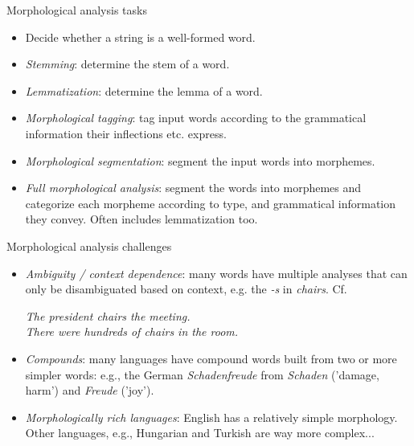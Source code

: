 \documentclass[style=upen, size=14pt]{powerdot}
\newcommand{\gold}{\color{arany}}
\begin{document}
\begin{slide}[toc=]{Morphological analysis tasks}
  \begin{itemize}
  \item Decide whether a string is a well-formed word.
  \item \emph{\gold Stemming}: determine the stem of a word.
  \item \emph{\gold Lemmatization}: determine the lemma of a word.
  \item \emph{\gold Morphological tagging}: tag input words according to the grammatical
    information their inflections etc. express.
  \item \emph{\gold Morphological segmentation}: segment the input words into morphemes.
  \item \emph{\gold Full morphological analysis}: segment the words into morphemes and
    categorize each morpheme according to type, and grammatical information they
    convey. Often includes lemmatization too.
  \end{itemize}
\end{slide}

\begin{slide}[toc=]{Morphological analysis challenges}
  \begin{itemize}
  \item \emph{\gold Ambiguity / context dependence}: many words have multiple
    analyses that can only be disambiguated based on context, e.g.  the
    \emph{-s} in \emph{chairs}. Cf.\smallskip

    \emph{The president {\gold chairs} the meeting.}\\ 
    \emph{There were hundreds of {\gold chairs} in the room.}\smallskip 
    
  \item \emph{\gold Compounds}: many languages have compound words built from
    two or more simpler words: e.g., the German \emph{Schadenfreude} from
    \emph{Schaden} ('damage, harm') and \emph{Freude} ('joy').
  \item \emph{\gold Morphologically rich languages}: English has a relatively
    simple morphology. Other languages, e.g., Hungarian and Turkish are way more
    complex...
  \end{itemize}
\end{slide}
\end{document}
